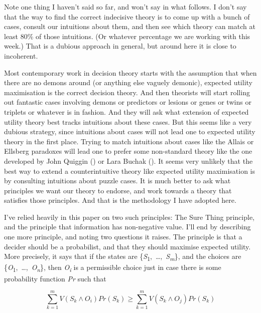 \documentclass[
  11pt,
  letterpaper,
  DIV=11,
  numbers=noendperiod,
  twoside]{scrartcl}
\begin{document}
Note one thing I haven't said so far, and won't say in what follows. I
don't say that the way to find the correct indecisive theory is to come
up with a bunch of cases, consult our intuitions about them, and then
see which theory can match at least 80\% of those intuitions. (Or
whatever percentage we are working with this week.) That is a dubious
approach in general, but around here it is close to incoherent.

Most contemporary work in decision theory starts with the assumption
that when there are no demons around (or anything else vaguely demonic),
expected utility maximisation is the correct decision theory. And then
theorists will start rolling out fantastic cases involving demons or
predictors or lesions or genes or twins or triplets or whatever is in
fashion. And they will ask what extension of expected utility theory
best tracks intuitions about these cases. But this seems like a very
dubious strategy, since intuitions about cases will not lead one to
expected utility theory in the first place. Trying to match intuitions
about cases like the Allais or Ellsberg paradoxes will lead one to
prefer some non-standard theory like the one developed by John Quiggin
() or Lara Buchak
(). It seems very unlikely that the best
way to extend a counterintuitive theory like expected utility
maximisation is by consulting intuitions about puzzle cases. It is much
better to ask what principles we want our theory to endorse, and work
towards a theory that satisfies those principles. And that is the
methodology I have adopted here.

I've relied heavily in this paper on two such principles: The Sure Thing
principle, and the principle that information has non-negative value.
I'll end by describing one more principle, and noting two questions it
raises. The principle is that a decider should be a probabilist, and
that they should maximise expected utility. More precisely, it says that
if the states are
\{\emph{S}\textsubscript{1},~\ldots,~\emph{S\textsubscript{m}}\}, and
the choices are
\{\emph{O}\textsubscript{1},~\ldots,~\emph{O\textsubscript{n}}\}, then
\emph{O\textsubscript{i}} is a permissible choice just in case there is
some probability function \emph{Pr} such that

\[
\sum_{k = 1}^m V(S_k \wedge O_i)Pr(S_k) \geq \sum_{k = 1}^m V(S_k \wedge O_j)Pr(S_k)
\]
\end{document}
